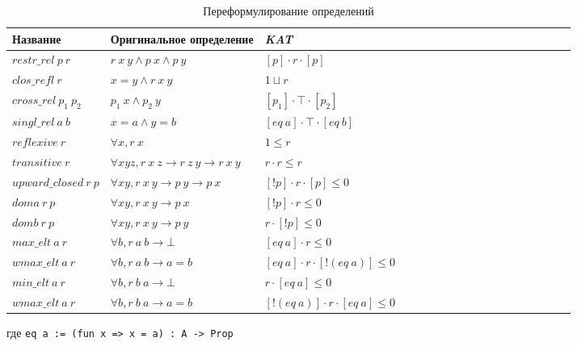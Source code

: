 \documentclass[times
              ]{itmo-student-thesis}
\begin{document}
    \begin{table}[!h]
      \caption{Переформулирование определений}\label{tab1}
      \centering
      \begin{tabularx}{\textwidth}{|*{18}{>{\centering\arraybackslash}X|}}\hline
        Название & Оригинальное определение & \textit{KAT}
        \\\hline
        $ restr\_rel\ p\ r $ &
        $ r\ x\ y \wedge p\ x \wedge p\ y $ &
        $ [p] \cdot r \cdot [p]  $
        \\\hline
        $ clos\_refl\ r $ &
        $ x = y \wedge r\ x\ y $ &
        $ 1 \sqcup r $
        \\\hline
        $ cross\_rel\ p_1\ p_2 $ &
        $ p_1\ x \wedge p_2\ y $ &
        $ [p_1] \cdot \top \cdot [p_2] $
        \\\hline
        $ singl\_rel\ a\ b $ &
        $ x = a \wedge y = b $ &
        $ [eq\ a] \cdot \top \cdot [eq\ b] $
        \\\hline
        $ reflexive\ r $ &
        $ \forall x, r\ x $ &
        $ 1 \leq r $
        \\\hline
        $ transitive\ r $ &
        $ \forall x y z, r\ x\ z \!\rightarrow\! r\ z\ y \!\rightarrow\! r\ x\ y $ &
        $ r \cdot r \leq r $
        \\\hline
        $ upward\_closed\ r\ p $ &
        $ \forall x y, r\ x\ y \rightarrow p\ y \rightarrow p\ x $ &
        $ [!p] \cdot r \cdot [p] \leq 0 $
        \\\hline
        $ doma\ r\ p $ &
        $ \forall x y, r\ x\ y \rightarrow p\ x $ &
        $ [!p] \cdot r \leq 0 $
        \\\hline
        $ domb\ r\ p $ &
        $ \forall x y, r\ x\ y \rightarrow p\ y $ &
        $ r \cdot [!p] \leq 0 $
        \\\hline
        $ max\_elt\ a\ r $ &
        $ \forall b, r\ a\ b \rightarrow \bot $ &
        $ [eq\ a] \cdot r \leq 0 $
        \\\hline
        $ wmax\_elt\ a\ r $ &
        $ \forall b, r\ a\ b \rightarrow a = b $ &
        $ [eq\ a] \cdot r \cdot [!(eq\ a)] \leq 0 $
        \\\hline
        $ min\_elt\ a\ r $ &
        $ \forall b, r\ b\ a \rightarrow \bot $ &
        $ r \cdot  [eq\ a] \leq 0$
        \\\hline
        $ wmax\_elt\ a\ r $ &
        $ \forall b, r\ b\ a \rightarrow a = b $ &
        $ [!(eq\ a)] \cdot r \cdot [eq\ a] \leq 0 $
        \\\hline
      \end{tabularx}
    где \lstinline[language=coq]{eq a := (fun x => x = a) : A -> Prop}
    \end{table}
\end{document}

